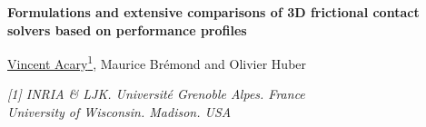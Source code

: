 \documentclass[11pt,a4paper]{article}
\begin{document}
	
	\begin{center}
		
		{\Large\bf Formulations and extensive comparisons of 3D frictional contact solvers based on performance profiles}\vspace{11pt}
		
		{\large  \underline{Vincent Acary\textsuperscript
                    {1}}, Maurice Br\'emond and Olivier Huber}
		\vspace{11pt}
		
		{\small\itshape [1] INRIA \& LJK. Universit\'e Grenoble Alpes. France\\
                \protect{[2]} University of Wisconsin. Madison. USA}
	\end{center}
	
\end{document}
